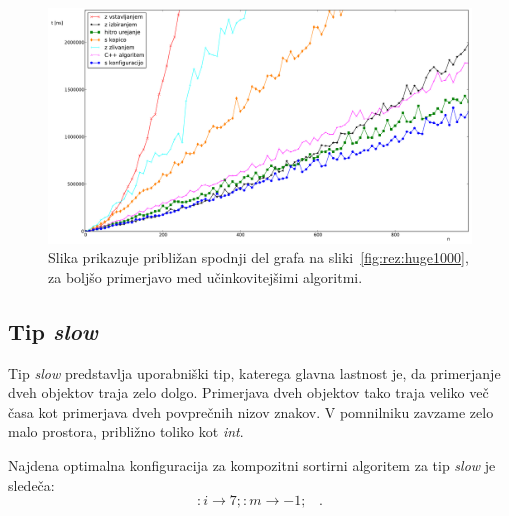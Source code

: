 \documentclass[a4paper,oneside,12pt]{article}
\newcommand{\lra}{\ensuremath{\longrightarrow}}
\newcommand{\edot}{\;\;\;.}
\begin{document}
\begin{figure}[h!]
    \includegraphics[width=\textwidth]{slike/huge1000zoom.pdf}
    \vspace{-0.7cm}
    \caption[Rezultati za tip \emph{huge}, 1000 el. -- približano]{Slika
    prikazuje približan spodnji del grafa na sliki~\ref{fig:rez:huge1000}, za
    boljšo primerjavo med učinkovitejšimi algoritmi. }
    \label{fig:rez:hugeblizu}
\end{figure}
\pagebreak

\subsection{Tip \emph{slow}}
\label{chapter:rez:slow}
Tip \emph{slow} predstavlja uporabniški tip, katerega glavna lastnost je, da primerjanje dveh objektov
traja zelo dolgo. Primerjava dveh objektov tako traja veliko več časa kot primerjava dveh povprečnih
nizov znakov. V pomnilniku zavzame zelo malo prostora, približno toliko kot \emph{int}.

Najdena optimalna konfiguracija za kompozitni sortirni algoritem za tip \emph{slow} je sledeča:
\[ :i \lra 7;:m \lra -1; \edot \]
\end{document}
